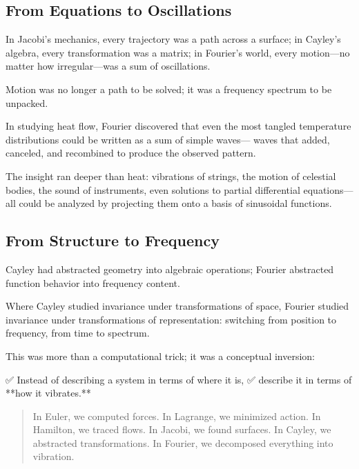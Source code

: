 \bigskip

\subsection*{From Equations to Oscillations}

In Jacobi’s mechanics, every trajectory was a path across a surface;  
in Cayley’s algebra, every transformation was a matrix;  
in Fourier’s world, every motion—no matter how irregular—was a sum of oscillations.

Motion was no longer a path to be solved;  
it was a frequency spectrum to be unpacked.

In studying heat flow, Fourier discovered that even the most tangled temperature distributions could be written as a sum of simple waves—  
waves that added, canceled, and recombined to produce the observed pattern.

The insight ran deeper than heat:  
vibrations of strings, the motion of celestial bodies, the sound of instruments, even solutions to partial differential equations—  
all could be analyzed by projecting them onto a basis of sinusoidal functions.

\bigskip

\subsection*{From Structure to Frequency}

Cayley had abstracted geometry into algebraic operations;  
Fourier abstracted function behavior into frequency content.

Where Cayley studied invariance under transformations of space,  
Fourier studied invariance under transformations of representation:  
switching from position to frequency, from time to spectrum.

This was more than a computational trick; it was a conceptual inversion:

✅ Instead of describing a system in terms of where it is,  
✅ describe it in terms of **how it vibrates.**

\bigskip

\begin{quote}
In Euler, we computed forces.  
In Lagrange, we minimized action.  
In Hamilton, we traced flows.  
In Jacobi, we found surfaces.  
In Cayley, we abstracted transformations.  
In Fourier, we decomposed everything into vibration.
\end{quote}

